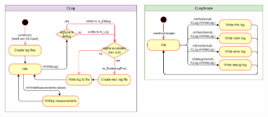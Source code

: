 \begin{figure}[H]
  \centering
  \includegraphics[width=\columnwidth]{uml/logger-state-diagram.png}
\end{figure}